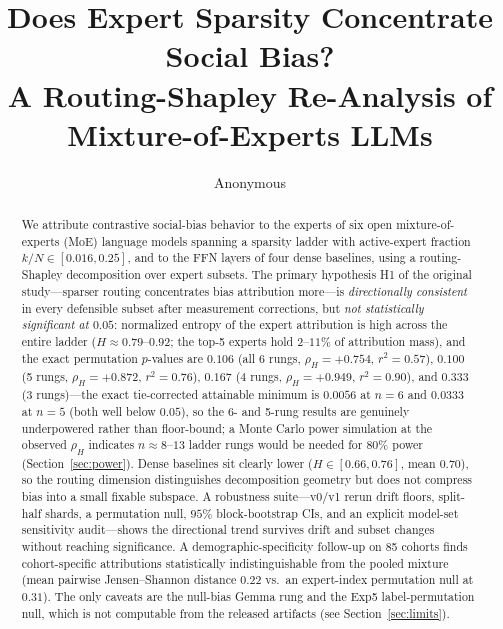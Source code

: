 \documentclass[sigconf]{acmart}
\begin{document}
\title{Does Expert Sparsity Concentrate Social Bias?\\
  A Routing-Shapley Re-Analysis of Mixture-of-Experts LLMs}

\author{Anonymous}
\email{}

\graphicspath{{../moe-expt-bias/expt-bias-1/stats_analysis/figures/}}

\newcommand{\takeaway}[1]{%
\par\medskip\noindent
\fbox{\begin{minipage}[c]{\dimexpr\linewidth-2\fboxsep-2\fboxrule\relax}%
\textbf{Take-away.}~#1\end{minipage}}\par\medskip}

\begin{abstract}
We attribute contrastive social-bias behavior to the experts of six open
mixture-of-experts (MoE) language models spanning a sparsity ladder with
active-expert fraction $k/N \in [0.016, 0.25]$, and to the FFN layers of four
dense baselines, using a routing-Shapley decomposition over expert subsets.
The primary hypothesis H1 of the original study---sparser routing
concentrates bias attribution more---is \emph{directionally consistent} in
every defensible subset after measurement corrections, but \emph{not
statistically significant at $0.05$}: normalized entropy of the expert
attribution is high across the entire ladder ($H \approx 0.79$--$0.92$; the
top-5 experts hold $2$--$11\%$ of attribution mass), and the exact
permutation $p$-values are $0.106$ (all 6 rungs, $\rho_H = +0.754$, $r^2 =
0.57$), $0.100$ (5 rungs, $\rho_H = +0.872$, $r^2 = 0.76$), $0.167$ (4
rungs, $\rho_H = +0.949$, $r^2 = 0.90$), and $0.333$ (3 rungs)---the exact
tie-corrected attainable minimum is $0.0056$ at $n=6$ and $0.0333$ at
$n=5$ (both well below $0.05$), so the 6- and 5-rung results are
genuinely underpowered rather than floor-bound; a Monte Carlo power
simulation at the observed $\rho_H$ indicates $n \approx 8$--$13$ ladder
rungs would be needed for $80\%$ power (Section~\ref{sec:power}). Dense
baselines sit clearly lower ($H \in [0.66, 0.76]$, mean $0.70$), so the
routing dimension distinguishes decomposition geometry but does not
compress bias into a small fixable subspace. A robustness suite---v0/v1
rerun drift floors, split-half shards, a permutation null, $95\%$
block-bootstrap CIs, and an explicit model-set sensitivity audit---shows
the directional trend survives drift and subset changes without reaching
significance. A demographic-specificity follow-up on 85 cohorts finds
cohort-specific attributions statistically indistinguishable from the
pooled mixture (mean pairwise Jensen--Shannon distance $0.22$ vs.\ an
expert-index permutation null at $0.31$). The only caveats are the
null-bias Gemma rung and the Exp5 label-permutation null, which is not
computable from the released artifacts (see
Section~\ref{sec:limits}).
\end{abstract}
\end{document}
